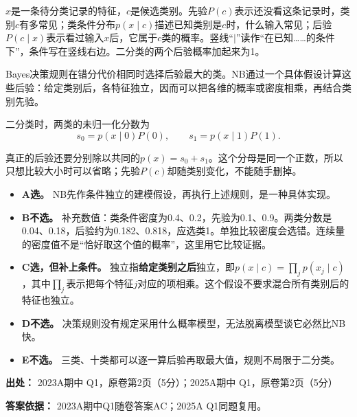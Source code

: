 \(x\)是一条待分类记录的特征，\(c\)是候选类别。先验\(P(c)\)表示还没看这条记录时，类别\(c\)有多常见；类条件分布\(p(x\mid c)\)描述已知类别是\(c\)时，什么输入常见；后验\(P(c\mid x)\)表示看过输入\(x\)后，它属于\(c\)类的概率。竖线“\(\mid\)”读作“在已知……的条件下”，条件写在竖线右边。二分类的两个后验概率加起来为1。


Bayes决策规则在错分代价相同时选择后验最大的类。NB通过一个具体假设计算这些后验：给定类别后，各特征独立，因而可以把各维的概率或密度相乘，再结合类别先验。


二分类时，两类的未归一化分数为
\[
s_0=p(x\mid0)P(0),\qquad s_1=p(x\mid1)P(1).
\]


真正的后验还要分别除以共同的\(p(x)=s_0+s_1\)。这个分母是同一个正数，所以只想比较大小时可以省略；先验\(P(c)\)却随类别变化，不能随手删掉。



\begin{itemize}

\item \textbf{A选。} NB先作条件独立的建模假设，再执行上述规则，是一种具体实现。

\item \textbf{B不选。} 补充数值：类条件密度为0.4、0.2，先验为0.1、0.9。两类分数是0.04、0.18，后验约为0.182、0.818，应选类1。单独比较密度会选错。连续量的密度值不是“恰好取这个值的概率”，这里用它比较证据。

\item \textbf{C选，但补上条件。} 独立指\textbf{给定类别之后}独立，即\(p(x\mid c)=\prod_j p(x_j\mid c)\)，其中\(\prod_j\)表示把每个特征\(j\)对应的项相乘。这个假设不要求混合所有类别后的特征也独立。

\item \textbf{D不选。} 决策规则没有规定采用什么概率模型，无法脱离模型谈它必然比NB快。

\item \textbf{E不选。} 三类、十类都可以逐一算后验再取最大值，规则不局限于二分类。

\end{itemize}


\textbf{出处：} 2023A期中 Q1，原卷第2页（5分）；2025A期中 Q1，原卷第2页（5分）


\textbf{答案依据：} 2023A期中Q1随卷答案AC；2025A Q1同题复用。

